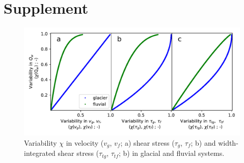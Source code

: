 \documentclass[11pt]{article}
\begin{document}
        
        \section{Supplement}
        
        \begin{center}
          \begin{figure}[H]
            \includegraphics[width=0.9\linewidth]{multi_run_vars.pdf}
            \caption{Variability $\chi$ in velocity ($v_g$, $v_f$; a) shear stress ($\tau_g$, $\tau_f$; b) and width-integrated shear stress ($\tau_{tg}$, $\tau_{tf}$; b)  in glacial and fluvial systems. }
            \label{fig:gammas}
          \end{figure}
        \end{center}
        
        
        
        
        
\end{document}
